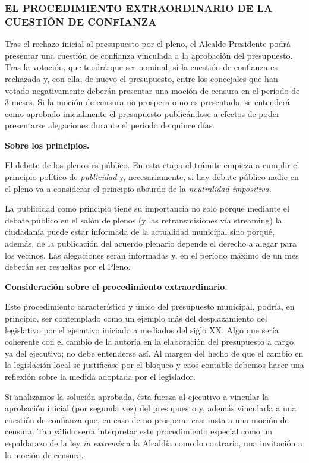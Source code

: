 \documentclass[
]{article}
\begin{document}
\hypertarget{el-procedimiento-extraordinario-de-la-cuestiuxf3n-de-confianza}{%
\subsubsection{EL PROCEDIMIENTO EXTRAORDINARIO DE LA CUESTIÓN DE
CONFIANZA}\label{el-procedimiento-extraordinario-de-la-cuestiuxf3n-de-confianza}}

Tras el rechazo inicial al presupuesto por el pleno, el
Alcalde-Presidente podrá presentar una cuestión de confianza vinculada a
la aprobación del presupuesto. Tras la votación, que tendrá que ser
nominal, si la cuestión de confianza es rechazada y, con ella, de nuevo
el presupuesto, entre los concejales que han votado negativamente
deberán presentar una moción de censura en el periodo de 3 meses. Si la
moción de censura no prospera o no es presentada, se entenderá como
aprobado inicialmente el presupuesto publicándose a efectos de poder
presentarse alegaciones durante el periodo de quince días.

\textbf{Sobre los principios.}

El debate de los plenos es público. En esta etapa el trámite empieza a
cumplir el principio político de \emph{publicidad} y, necesariamente, si
hay debate público nadie en el pleno va a considerar el principio
absurdo de la \emph{neutralidad impositiva.}

La publicidad como principio tiene su importancia no solo porque
mediante el debate público en el salón de plenos (y las retransmisiones
vía streaming) la ciudadanía puede estar informada de la actualidad
municipal sino porqué, además, de la publicación del acuerdo plenario
depende el derecho a alegar para los vecinos. Las alegaciones serán
informadas y, en el período máximo de un mes deberán ser resueltas por
el Pleno.

\textbf{Consideración sobre el procedimiento extraordinario.}

Este procedimiento característico y único del presupuesto municipal,
podría, en principio, ser contemplado como un ejemplo más del
desplazamiento del legislativo por el ejecutivo iniciado a mediados del
siglo XX. Algo que sería coherente con el cambio de la autoría en la
elaboración del presupuesto a cargo ya del ejecutivo; no debe entenderse
así. Al margen del hecho de que el cambio en la legislación local se
justificase por el bloqueo y caos contable debemos hacer una reflexión
sobre la medida adoptada por el legislador.

Si analizamos la solución aprobada, ésta fuerza al ejecutivo a vincular
la aprobación inicial (por segunda vez) del presupuesto y, además
vincularla a una cuestión de confianza que, en caso de no prosperar casi
insta a una moción de censura. Tan válido sería interpretar este
procedimiento especial como un espaldarazo de la ley \emph{in extremis}
a la Alcaldía como lo contrario, una invitación a la moción de censura.
\end{document}
